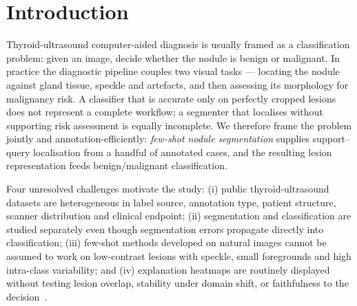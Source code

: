 \documentclass[jimh,article,submit,moreauthors,pdftex]{Definitions/tsp}
\begin{document}
\section{Introduction}\label{sec:introduction}

Thyroid-ultrasound computer-aided diagnosis is usually framed as a
classification problem: given an image, decide whether the nodule is
benign or malignant. In practice the diagnostic pipeline couples two
visual tasks --- locating the nodule against gland tissue, speckle and
artefacts, and then assessing its morphology for malignancy risk. A
classifier that is accurate only on perfectly cropped lesions does not
represent a complete workflow; a segmenter that localises without
supporting risk assessment is equally incomplete. We therefore frame the
problem jointly and annotation-efficiently: \emph{few-shot nodule
segmentation} supplies support--query localisation from a handful of
annotated cases, and the resulting lesion representation feeds
benign/malignant classification.

Four unresolved challenges motivate the study: (i) public
thyroid-ultrasound datasets are heterogeneous in label source, annotation
type, patient structure, scanner distribution and clinical endpoint;
(ii) segmentation and classification are studied separately even though
segmentation errors propagate directly into classification; (iii)
few-shot methods developed on natural images cannot be assumed to work on
low-contrast lesions with speckle, small foregrounds and high
intra-class variability; and (iv) explanation heatmaps are routinely
displayed without testing lesion overlap, stability under domain shift,
or faithfulness to the decision~\cite{rev_ahmed2026xai}.
\end{document}
